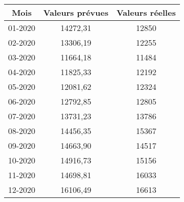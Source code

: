 \begin{tabular}{ccc}
\toprule
Mois & Valeurs prévues & Valeurs réelles \\
\midrule
01-2020 & 14272,31 & 12850 \\
02-2020 & 13306,19 & 12255 \\
03-2020 & 11664,18 & 11484 \\
04-2020 & 11825,33 & 12192 \\
05-2020 & 12081,62 & 12324 \\
06-2020 & 12792,85 & 12805 \\
07-2020 & 13731,23 & 13786 \\
08-2020 & 14456,35 & 15367 \\
09-2020 & 14663,90 & 14517 \\
10-2020 & 14916,73 & 15156 \\
11-2020 & 14698,81 & 16033 \\
12-2020 & 16106,49 & 16613 \\
\bottomrule
\end{tabular}
